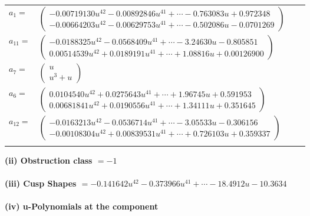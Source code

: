 \documentclass[1p]{elsarticle_modified}
\theoremstyle{definition}
\begin{document}
\begin{tabular}{m{7pt} m{180pt} m{7pt} m{180pt} }
\flushright $a_{1}=$&$\begin{pmatrix}-0.00719130 u^{42}-0.00892846 u^{41}+\cdots-0.763083 u+0.972348\\-0.00664203 u^{42}-0.00629753 u^{41}+\cdots-0.502086 u-0.0701269\end{pmatrix}$ \\
\flushright $a_{11}=$&$\begin{pmatrix}-0.0188325 u^{42}-0.0568409 u^{41}+\cdots-3.24630 u-0.805851\\0.00514539 u^{42}+0.0189191 u^{41}+\cdots+1.08816 u+0.00126900\end{pmatrix}$ \\
\flushright $a_{7}=$&$\begin{pmatrix}u\\u^3+u\end{pmatrix}$ \\
\flushright $a_{6}=$&$\begin{pmatrix}0.0104540 u^{42}+0.0275643 u^{41}+\cdots+1.96745 u+0.591953\\0.00681841 u^{42}+0.0190556 u^{41}+\cdots+1.34111 u+0.351645\end{pmatrix}$ \\
\flushright $a_{12}=$&$\begin{pmatrix}-0.0163213 u^{42}-0.0536714 u^{41}+\cdots-3.05533 u-0.306156\\-0.00108304 u^{42}+0.00839531 u^{41}+\cdots+0.726103 u+0.359337\end{pmatrix}$\\&\end{tabular}
\flushleft \textbf{(ii) Obstruction class $= -1$}\\~\\
\flushleft \textbf{(iii) Cusp Shapes $= -0.141642 u^{42}-0.373966 u^{41}+\cdots-18.4912 u-10.3634$}\\~\\
\newpage\renewcommand{\arraystretch}{1}
\flushleft \textbf{(iv) u-Polynomials at the component}\newline \\
\end{document}
